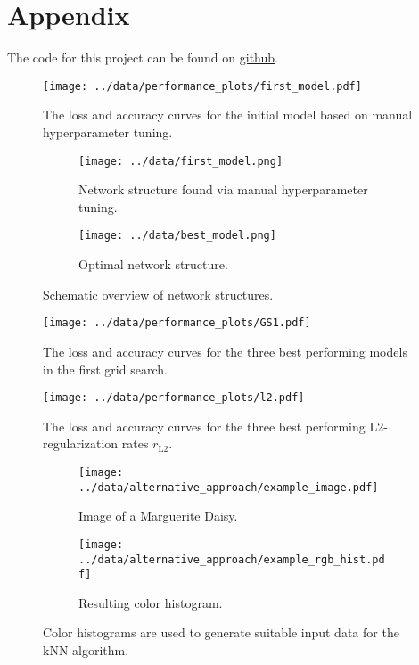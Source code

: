 \section{Appendix}
\label{sec:appendix}
The code for this project can be found on \href{https://github.com/LukasBeiske/project_Flowers-299}{github}.

\begin{figure}
    \centering
    \texttt{[image: ../data/performance\_plots/first\_model.pdf]}
    \caption{The loss and accuracy curves for the initial model based on manual hyperparameter tuning.}
    \label{fig:first_curves}
\end{figure}

\begin{figure}
    \centering    
    \begin{subfigure}{0.49\textwidth}
        \centering
        \texttt{[image: ../data/first\_model.png]}
        \caption{Network structure found via manual hyperparameter tuning.}
        \label{fig:first_model}
    \end{subfigure}
    \hfill
    \begin{subfigure}{0.49\textwidth}
        \centering
        \texttt{[image: ../data/best\_model.png]}
        \caption{Optimal network structure.}
        \label{fig:best_model}
    \end{subfigure}
    \caption{Schematic overview of network structures.}
\end{figure}

\begin{figure}
    \centering
    \texttt{[image: ../data/performance\_plots/GS1.pdf]}
    \caption{The loss and accuracy curves for the three best performing models in the first grid search.}
    \label{fig:GS1}
\end{figure}

\begin{figure}
    \centering
    \texttt{[image: ../data/performance\_plots/l2.pdf]}
    \caption{The loss and accuracy curves for the three best performing L2-regularization rates $r_\text{L2}$.}
    \label{fig:l2}
\end{figure}

\begin{figure}
    \centering    
    \begin{subfigure}{0.49\textwidth}
        \centering
        \texttt{[image: ../data/alternative\_approach/example\_image.pdf]}
        \caption{Image of a Marguerite Daisy.}
    \end{subfigure}
    \hfill
    \begin{subfigure}{0.49\textwidth}
        \centering
        \texttt{[image: ../data/alternative\_approach/example\_rgb\_hist.pdf]}
        \caption{Resulting color histogram.}
    \end{subfigure}
    \caption{Color histograms are used to generate suitable input data for the kNN algorithm.}
    \label{fig:kNN_hist}
\end{figure}